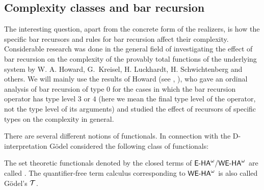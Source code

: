 \subsection{Complexity classes and bar recursion}\label{s:compPM}

The interesting question, apart from the concrete form of the realizers,
 is how the specific bar recursors and
rules for bar recursion affect their complexity. Considerable
research was done in the general field of investigating
the effect of bar recursion on the complexity of the provably total functions
of the underlying system by 
W. A. Howard, 
G.~Kreisel, 
H. Luckhardt,
H. Schwichtenberg
and others. 
We will mainly use the results of
Howard (see \cite{Howard68}, \cite{Howard81}), who gave an 
ordinal analysis of bar recursion of type 
$0$ for the cases in which the bar recursion operator has type level $3$ or $4$ (here 
we mean the final type level of the operator, not the type level of its arguments) 
and studied the effect of recursors of specific types
on the complexity in general.
%

There are several different notions of 
functionals. In connection with the D-interpretation G\"odel considered the
following class of functionals:

\begin{dfn}\label{d:GT}
The set theoretic functionals denoted by the closed terms of ${\textsf{\upshape E-HA}}^\omega/{\textsf{\upshape WE-HA}}^{\omega}$
are called .
The quantifier-free term calculus corresponding to ${\textsf{\upshape WE-HA}}^{\omega}$ is also called 
G\"odel's $\mathcal{T}$.
\end{dfn}


